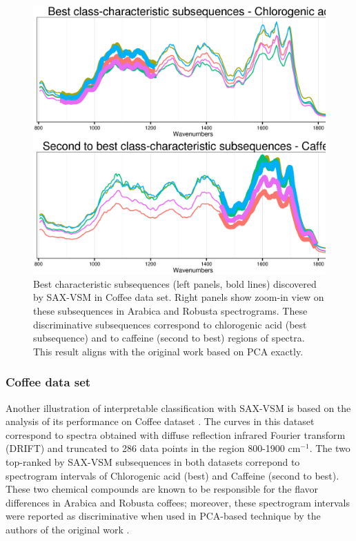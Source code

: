 \begin{figure}[t]
   \centering
   \includegraphics[width=140mm]{figures/coffee_patterns.ps}
   \caption{
   Best characteristic subsequences (left panels, bold lines) discovered by SAX-VSM in
   {Coffee data set}. Right panels show zoom-in view on these subsequences in Arabica
   and Robusta spectrograms.
   These discriminative subsequences correspond to chlorogenic acid (best subsequence) 
   and to caffeine (second to best) regions of spectra. This result aligns with
   the original work based on PCA \cite{citeulike:12550833} exactly.
   }
   \label{fig:coffee}
\end{figure}

\subsubsection{Coffee data set}
Another illustration of interpretable classification with SAX-VSM is based on the analysis of its
performance on Coffee dataset \cite{citeulike:12550833}. The curves in this dataset correspond to spectra
obtained with diffuse reflection infrared Fourier transform (DRIFT) and truncated to 286 data points
in the region 800-1900 cm$^{-1}$. The two top-ranked by SAX-VSM subsequences in both datasets
correpond to spectrogram intervals of Chlorogenic acid (best) and Caffeine (second to best).
These two chemical compounds are known to be responsible for the flavor differences in 
Arabica and Robusta coffees; moreover, these spectrogram intervals were reported 
as discriminative when used in PCA-based technique by the authors of the original work
\cite{citeulike:12550833}.

